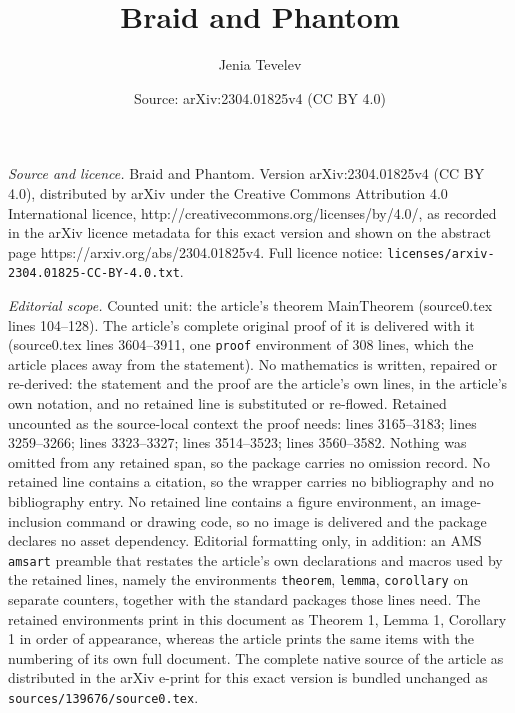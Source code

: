 \documentclass[10pt,a4paper]{amsart}
\title{Braid and Phantom}
\author{Jenia Tevelev}
\date{Source: arXiv:2304.01825v4 (CC BY 4.0)}
\begin{document}
\maketitle

\noindent\emph{Source and licence.} Braid and Phantom. Version arXiv:2304.01825v4 (CC BY 4.0), distributed by arXiv under the Creative Commons Attribution 4.0 International licence, http://creativecommons.org/licenses/by/4.0/, as recorded in the arXiv licence metadata for this exact version and shown on the abstract page https://arxiv.org/abs/2304.01825v4. Full licence notice: \texttt{licenses/arxiv-2304.01825-CC-BY-4.0.txt}.\par\smallskip

\noindent\textit{Editorial scope.} Counted unit: the article's theorem MainTheorem (source0.tex lines 104--128). The article's complete original proof of it is delivered with it (source0.tex lines 3604--3911, one \texttt{proof} environment of 308 lines, which the article places away from the statement). No mathematics is written, repaired or re-derived: the statement and the proof are the article's own lines, in the article's own notation, and no retained line is substituted or re-flowed.  Retained uncounted as the source-local context the proof needs: lines 3165--3183; lines 3259--3266; lines 3323--3327; lines 3514--3523; lines 3560--3582.  Nothing was omitted from any retained span, so the package carries no omission record.  No retained line contains a citation, so the wrapper carries no bibliography and no bibliography entry.  No retained line contains a figure environment, an image-inclusion command or drawing code, so no image is delivered and the package declares no asset dependency.  Editorial formatting only, in addition: an AMS \texttt{amsart} preamble that restates the article's own declarations and macros used by the retained lines, namely the environments \texttt{theorem}, \texttt{lemma}, \texttt{corollary} on separate counters, together with the standard packages those lines need.  The retained environments print in this document as Theorem 1, Lemma 1, Corollary 1 in order of appearance, whereas the article prints the same items with the numbering of its own full document.  The complete native source of the article as distributed in the arXiv e-print for this exact version is bundled unchanged as \texttt{sources/139676/source0.tex}.
\end{document}
